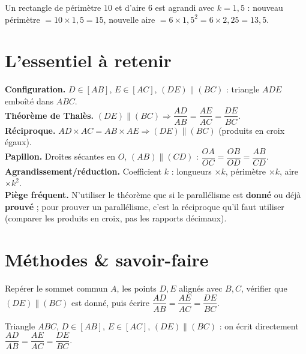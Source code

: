 \begin{exemple}
Un rectangle de périmètre $10$ et d'aire $6$ est agrandi avec $k=1{,}5$ : nouveau périmètre
$=10\times1{,}5=15$, nouvelle aire $=6\times1{,}5^{2}=6\times2{,}25=13{,}5$.
\end{exemple}

\section{L'essentiel à retenir}

\begin{synthese}
\textbf{Configuration.} $D\in[AB]$, $E\in[AC]$, $(DE)\parallel(BC)$ : triangle $ADE$
emboîté dans $ABC$.\\[4pt]
\textbf{Théorème de Thalès.} $(DE)\parallel(BC)\Rightarrow\dfrac{AD}{AB}=\dfrac{AE}{AC}=\dfrac{DE}{BC}$.\\[4pt]
\textbf{Réciproque.} $AD\times AC=AB\times AE\Rightarrow(DE)\parallel(BC)$ (produits en
croix égaux).\\[4pt]
\textbf{Papillon.} Droites sécantes en $O$, $(AB)\parallel(CD)$ :
$\dfrac{OA}{OC}=\dfrac{OB}{OD}=\dfrac{AB}{CD}$.\\[4pt]
\textbf{Agrandissement/réduction.} Coefficient $k$ : longueurs $\times k$, périmètre
$\times k$, aire $\times k^{2}$.\\[4pt]
\textbf{Piège fréquent.} N'utiliser le théorème que si le parallélisme est \textbf{donné}
ou déjà \textbf{prouvé} ; pour prouver un parallélisme, c'est la réciproque qu'il faut
utiliser (comparer les produits en croix, pas les rapports décimaux).
\end{synthese}

\section{Méthodes \& savoir-faire}

Repérer le sommet commun $A$, les points $D,E$ alignés avec $B,C$, vérifier que
$(DE)\parallel(BC)$ est donné, puis écrire $\dfrac{AD}{AB}=\dfrac{AE}{AC}=\dfrac{DE}{BC}$.
\begin{exemple}
Triangle $ABC$, $D\in[AB]$, $E\in[AC]$, $(DE)\parallel(BC)$ : on écrit directement
$\dfrac{AD}{AB}=\dfrac{AE}{AC}=\dfrac{DE}{BC}$.
\end{exemple}


